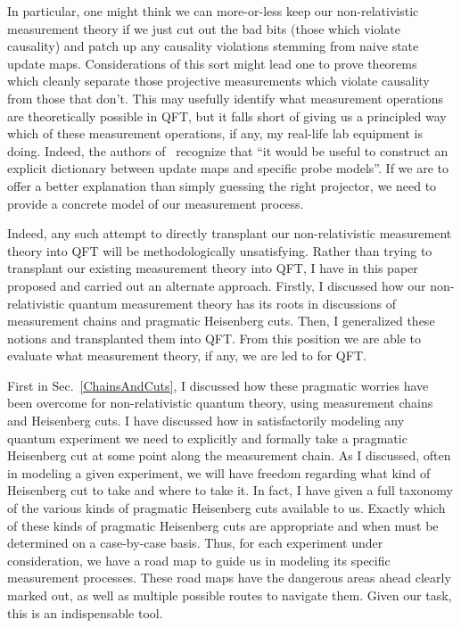 \documentclass[12pt,prd,superscriptaddress,floatfix,amsmath,amssymb,amsfonts,nofootinbib]{revtex4-2}
\begin{document}
In particular, one might think we can more-or-less keep our non-relativistic measurement theory if we just cut out the bad bits (those which violate causality) and patch up any causality violations stemming from naive state update maps. Considerations of this sort might lead one to prove theorems~\cite{BorstenJubbKells,Jubb2022} which cleanly separate those projective measurements which violate causality from those that don't. This may usefully identify what measurement operations are theoretically possible in QFT, but it falls short of giving us a principled way which of these measurement operations, if any, my real-life lab equipment is doing. Indeed, the authors of~\cite{Jubb2022} recognize that ``it would be useful to construct an explicit
dictionary between update maps and specific probe models''. If we are to offer a better explanation than simply guessing the right projector, we need to provide a concrete model of our measurement process.

Indeed, any such attempt to directly transplant our non-relativistic measurement theory into QFT will be methodologically unsatisfying. Rather than trying to transplant our existing measurement theory into QFT, I have in this paper proposed and carried out an alternate approach. Firstly, I discussed how our non-relativistic quantum measurement theory has its roots in discussions of measurement chains and pragmatic Heisenberg cuts. Then, I generalized these notions and transplanted them into QFT. From this position we are able to evaluate what measurement theory, if any, we are led to for QFT. 

First in Sec.~\ref{ChainsAndCuts}, I discussed how these pragmatic worries have been overcome for non-relativistic quantum theory, using measurement chains and Heisenberg cuts. I have discussed how in satisfactorily modeling any quantum experiment we need to explicitly and formally take a pragmatic Heisenberg cut at some point along the measurement chain. As I discussed, often in modeling a given experiment, we will have freedom regarding what kind of Heisenberg cut to take and where to take it. In fact, I have given a full taxonomy of the various kinds of pragmatic Heisenberg cuts available to us. Exactly  which of these kinds of pragmatic Heisenberg cuts are appropriate and when must be determined on a case-by-case basis. Thus, for each experiment under consideration, we have a road map to guide us in modeling its specific measurement processes. These road maps have the dangerous areas ahead clearly marked out, as well as multiple possible routes to navigate them. Given our task, this is an indispensable tool.
\end{document}
